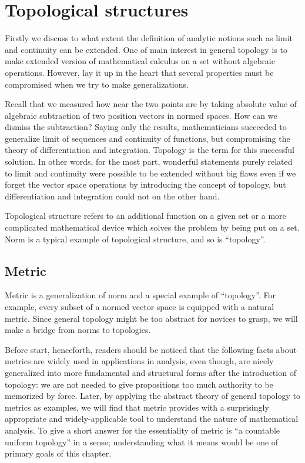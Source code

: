 \documentclass{../crs}
\begin{document}
\mainmatter


\chapter{Topological structures}

Firstly we discuss to what extent the definition of analytic notions such as limit and continuity can be extended.
One of main interest in general topology is to make extended version of mathematical calculus on a set without algebraic operations.
However, lay it up in the heart that several properties must be compromised when we try to make generalizations.

Recall that we measured how near the two points are by taking absolute value of algebraic subtraction of two position vectors in normed spaces.
How can we dismiss the subtraction?
Saying only the results, mathematicians succeeded to generalize limit of sequences and continuity of functions, but compromising the theory of differentiation and integration.
Topology is the term for this successful solution.
In other words, for the most part, wonderful statements purely related to limit and continuity were possible to be extended without big flaws even if we forget the vector space operations by introducing the concept of topology, but differentiation and integration could not on the other hand.
 
Topological structure refers to an additional function on a given set or a more complicated mathematical device which solves the problem by being put on a set.
Norm is a typical example of topological structure, and so is ``topology''.


\section{Metric}

Metric is a generalization of norm and a special example of ``topology''.
For example, every subset of a normed vector space is equipped with a natural metric.
Since general topology might be too abstract for novices to grasp, we will make a bridge from norms to topologies.

Before start, henceforth, readers should be noticed that the following facts about metrics are widely used in applications in analysis, even though, are nicely generalized into more fundamental and structural forms after the introduction of topology: we are not needed to give propositions too much authority to be memorized by force.
Later, by applying the abstract theory of general topology to metrics as examples, we will find that metric provides with a surprisingly appropriate and widely-applicable tool to understand the nature of mathematical analysis.
To give a short answer for the essentiality of metric is ``a countable uniform topology'' in a sense; understanding what it means would be one of primary goals of this chapter.
\end{document}
